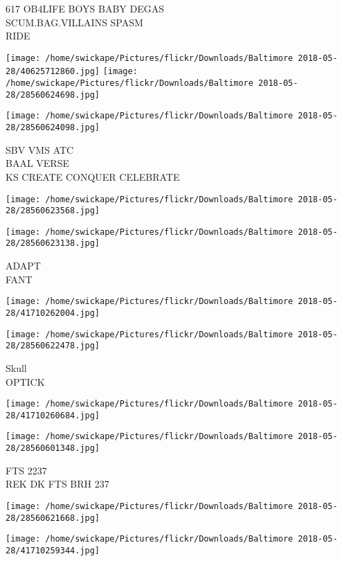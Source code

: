 \documentclass[10pt,letterpaper]{article}
\begin{document}
617 OB4LIFE BOYS BABY DEGAS\\
SCUM.BAG.VILLAINS SPASM\\
RIDE
\pagebreak

\texttt{[image: /home/swickape/Pictures/flickr/Downloads/Baltimore 2018-05-28/40625712860.jpg]}
\texttt{[image: /home/swickape/Pictures/flickr/Downloads/Baltimore 2018-05-28/28560624698.jpg]}

\texttt{[image: /home/swickape/Pictures/flickr/Downloads/Baltimore 2018-05-28/28560624098.jpg]}

SBV VMS ATC\\
BAAL VERSE\\
KS CREATE CONQUER CELEBRATE
\pagebreak

\texttt{[image: /home/swickape/Pictures/flickr/Downloads/Baltimore 2018-05-28/28560623568.jpg]}

\vspace{0.25in}
\texttt{[image: /home/swickape/Pictures/flickr/Downloads/Baltimore 2018-05-28/28560623138.jpg]}

ADAPT\\
FANT
\pagebreak

\texttt{[image: /home/swickape/Pictures/flickr/Downloads/Baltimore 2018-05-28/41710262004.jpg]}

\vspace{0.25in}
\texttt{[image: /home/swickape/Pictures/flickr/Downloads/Baltimore 2018-05-28/28560622478.jpg]}

Skull\\
OPTICK
\pagebreak

\texttt{[image: /home/swickape/Pictures/flickr/Downloads/Baltimore 2018-05-28/41710260684.jpg]}

\vspace{0.25in}
\texttt{[image: /home/swickape/Pictures/flickr/Downloads/Baltimore 2018-05-28/28560601348.jpg]}

FTS 2237\\
REK DK FTS BRH 237
\pagebreak

\texttt{[image: /home/swickape/Pictures/flickr/Downloads/Baltimore 2018-05-28/28560621668.jpg]}

\vspace{0.25in}
\texttt{[image: /home/swickape/Pictures/flickr/Downloads/Baltimore 2018-05-28/41710259344.jpg]}
\end{document}
